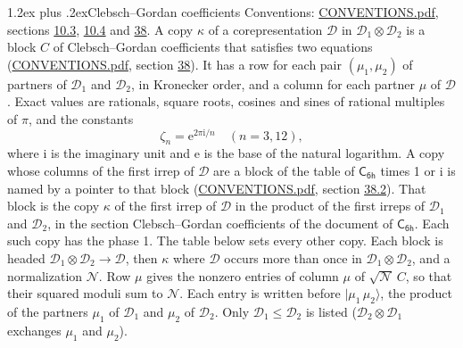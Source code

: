 \documentclass[10pt,a4paper]{article}
\makeatletter
\renewcommand\section{\@startsection{section}{1}{\z@}{-3ex plus -1ex minus -.2ex}%
  {1.2ex plus .2ex}{\normalfont\large\sffamily\bfseries\color{parttitle}}}
\numberwithin{equation}{section}
\newcommand{\grp}[1]{\mathsf{#1}}
\newcommand{\iunit}{\mathrm{i}}
\newcommand{\expe}{\mathrm{e}}
\newcommand{\rootunity}[1]{\zeta_{#1}}
\newcommand{\irrprod}{\otimes}
\newcommand{\mult}{\kappa}
\newcommand{\intx}{\mu}
\newcommand{\cgnorm}{\mathcal{N}}
\newcommand{\prodket}[2]{\lvert {#1}\,{#2}\rangle}
\makeatother
\begin{document}
\section{Clebsch--Gordan coefficients}\label{s:clebsch_gordan}
Conventions: \href{../../CONVENTIONS.pdf}{CONVENTIONS.pdf}, sections \href{../../../rotation/CONVENTIONS.pdf\#conv.10.3}{10.3}, \href{../../../rotation/CONVENTIONS.pdf\#conv.10.4}{10.4} and \href{../../CONVENTIONS.pdf\#conv.38}{38}.
\leavevmode\label{n:index.copy}\label{n:matrix.cg.stored}A copy $\mult$ of a corepresentation $\mathcal{D}$ in $\mathcal{D}_1\irrprod\mathcal{D}_2$ is a block $C$ of Clebsch--Gordan coefficients that satisfies two equations (\href{../../CONVENTIONS.pdf}{CONVENTIONS.pdf}, section \href{../../CONVENTIONS.pdf\#conv.38}{38}). \label{n:index.cg}It has a row for each pair $(\intx_1, \intx_2)$ of partners of $\mathcal{D}_1$ and $\mathcal{D}_2$, in Kronecker order, and a column for each partner $\intx$ of $\mathcal{D}$.
\leavevmode\label{n:constant.root}\label{n:index.root.order}Exact values are rationals, square roots, cosines and sines of rational multiples of $\pi$, and the constants
\begin{equation}\label{e:constants}\rootunity{n} = \expe^{2\pi\iunit/n}\quad(n = 3, 12),\end{equation}
where $\iunit$ is the imaginary unit and $\expe$ is the base of the natural logarithm.
A copy whose columns of the first irrep of $\mathcal{D}$ are a block of the table of $\grp{C_{6h}}$ times 1 or $\iunit$ is named by a pointer to that block (\href{../../CONVENTIONS.pdf}{CONVENTIONS.pdf}, section \href{../../CONVENTIONS.pdf\#conv.38.2}{38.2}). That block is the copy $\mult$ of the first irrep of $\mathcal{D}$ in the product of the first irreps of $\mathcal{D}_1$ and $\mathcal{D}_2$, in the section Clebsch--Gordan coefficients of the document of \href{../../../rotation/data/pdf/C6h.pdf}{$\grp{C_{6h}}$}. Each such copy has the phase 1. The table below sets every other copy.
Each block is headed $\mathcal{D}_1\irrprod\mathcal{D}_2\to\mathcal{D}$, then $\mult$ where $\mathcal{D}$ occurs more than once in $\mathcal{D}_1\irrprod\mathcal{D}_2$, and a normalization $\cgnorm$. Row $\intx$ gives the nonzero entries of column $\intx$ of $\sqrt{\cgnorm}\,C$, so that their squared moduli sum to $\cgnorm$. \label{n:vector.ket.product}Each entry is written before $\prodket{\intx_1}{\intx_2}$, the product of the partners $\intx_1$ of $\mathcal{D}_1$ and $\intx_2$ of $\mathcal{D}_2$. Only $\mathcal{D}_1 \le \mathcal{D}_2$ is listed ($\mathcal{D}_2\irrprod\mathcal{D}_1$ exchanges $\intx_1$ and $\intx_2$).
\end{document}
